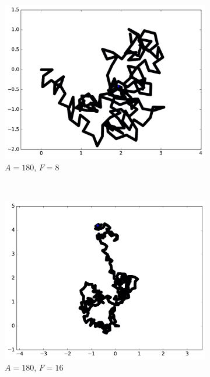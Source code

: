 \begin{figure}[htb]
\begin{subfigure}[t]{\subImgWmo}
			\includegraphics[width=\textwidth]{figures/ch3/synTraj_219_180_8}
			\caption[$A = 180$, $F=1$]{$A = 180$, $F=8$}
			\label{fig:synTraj_219_180_8}
		\end{subfigure}
		~
		\begin{subfigure}[t]{\subImgWmo}
			\centering
			\includegraphics[width=\textwidth]{figures/ch3/synTraj_219_180_16}
			\caption[$A = 180$, $F=16$]{$A = 180$, $F=16$}
			\label{fig:synTraj_219_180_16}
		\end{subfigure}
		~
		\begin{subfigure}[t]{\subImgWmo}
			\centering

\end{subfigure}
\end{figure}
